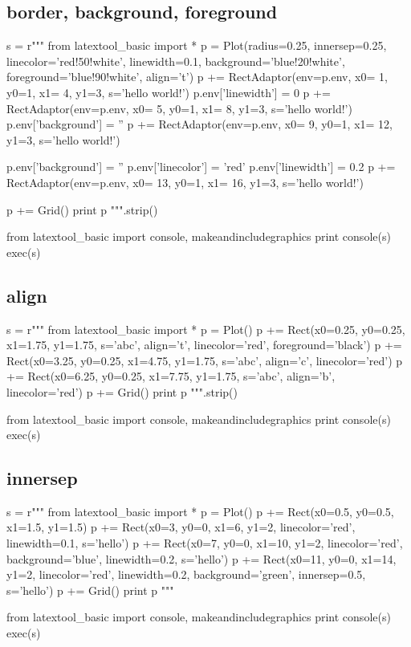 \newpage
\subsection{border, background, foreground}

\begin{python}
s = r"""
from latextool_basic import *
p = Plot(radius=0.25, innersep=0.25,
         linecolor='red!50!white', linewidth=0.1,
         background='blue!20!white', foreground='blue!90!white', 
         align='t')
p += RectAdaptor(env=p.env, x0= 1, y0=1, x1= 4, y1=3, s='hello world!')
p.env['linewidth'] = 0
p += RectAdaptor(env=p.env, x0= 5, y0=1, x1= 8, y1=3, s='hello world!')
p.env['background'] = ''
p += RectAdaptor(env=p.env, x0= 9, y0=1, x1= 12, y1=3, s='hello world!')

p.env['background'] = ''
p.env['linecolor'] = 'red'
p.env['linewidth'] = 0.2
p += RectAdaptor(env=p.env, x0= 13, y0=1, x1= 16, y1=3, s='hello world!')

p += Grid()
print p
""".strip()

from latextool_basic import console, makeandincludegraphics
print console(s)
exec(s)
\end{python}




\newpage
\subsection{align}
\begin{python}
s = r"""
from latextool_basic import *
p = Plot()
p += Rect(x0=0.25, y0=0.25, x1=1.75, y1=1.75, s='abc', align='t', 
          linecolor='red', foreground='black')
p += Rect(x0=3.25, y0=0.25, x1=4.75, y1=1.75, s='abc', align='c', 
          linecolor='red')
p += Rect(x0=6.25, y0=0.25, x1=7.75, y1=1.75, s='abc', align='b', 
          linecolor='red')
p += Grid()
print p
""".strip()

from latextool_basic import console, makeandincludegraphics
print console(s)
exec(s)
\end{python}



\newpage
\subsection{innersep}
\begin{python}
s = r"""
from latextool_basic import *
p = Plot()
p += Rect(x0=0.5, y0=0.5, x1=1.5, y1=1.5)
p += Rect(x0=3, y0=0, x1=6, y1=2, linecolor='red', linewidth=0.1, s='hello')
p += Rect(x0=7, y0=0, x1=10, y1=2, linecolor='red', background='blue', 
          linewidth=0.2, s='hello')
p += Rect(x0=11, y0=0, x1=14, y1=2, linecolor='red', linewidth=0.2,
          background='green',
          innersep=0.5, s='hello')
p += Grid()
print p
"""

from latextool_basic import console, makeandincludegraphics
print console(s)
exec(s)
\end{python}





